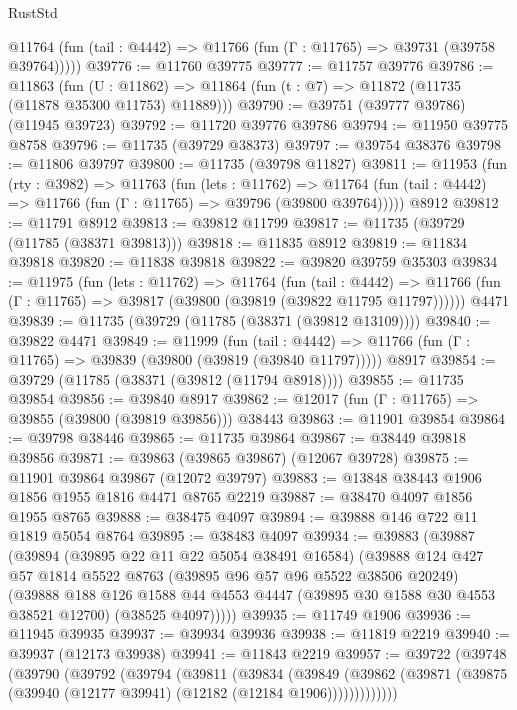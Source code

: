 \begin{lexlean}{RustStd}
\begin{coremodule}
      @11764 (fun (tail : @4442) => @11766 (fun (Γ : @11765) => @39731 (@39758 @39764)))))
@39776 := @11760 @39775
@39777 := @11757 @39776
@39786 := @11863
    (fun (U : @11862) => @11864 (fun (t : @7) => @11872 (@11735 (@11878 @35300 @11753) @11889)))
@39790 := @39751 (@39777 @39786) (@11945 @39723)
@39792 := @11720 @39776 @39786
@39794 := @11950 @39775 @8758
@39796 := @11735 (@39729 @38373)
@39797 := @39754 @38376
@39798 := @11806 @39797
@39800 := @11735 (@39798 @11827)
@39811 := @11953
    (fun (rty : @3982) =>
    @11763
      (fun (lets : @11762) =>
      @11764 (fun (tail : @4442) => @11766 (fun (Γ : @11765) => @39796 (@39800 @39764)))))
    @8912
@39812 := @11791 @8912
@39813 := @39812 @11799
@39817 := @11735 (@39729 (@11785 (@38371 @39813)))
@39818 := @11835 @8912
@39819 := @11834 @39818
@39820 := @11838 @39818
@39822 := @39820 @39759 @35303
@39834 := @11975
    (fun (lets : @11762) =>
    @11764
      (fun (tail : @4442) =>
      @11766 (fun (Γ : @11765) => @39817 (@39800 (@39819 (@39822 @11795 @11797))))))
    @4471
@39839 := @11735 (@39729 (@11785 (@38371 (@39812 @13109))))
@39840 := @39822 @4471
@39849 := @11999
    (fun (tail : @4442) => @11766 (fun (Γ : @11765) => @39839 (@39800 (@39819 (@39840 @11797)))))
    @8917
@39854 := @39729 (@11785 (@38371 (@39812 (@11794 @8918))))
@39855 := @11735 @39854
@39856 := @39840 @8917
@39862 := @12017 (fun (Γ : @11765) => @39855 (@39800 (@39819 @39856))) @38443
@39863 := @11901 @39854
@39864 := @39798 @38446
@39865 := @11735 @39864
@39867 := @38449 @39818 @39856
@39871 := @39863 (@39865 @39867) (@12067 @39728)
@39875 := @11901 @39864 @39867 (@12072 @39797)
@39883 := @13848 @38443 @1906 @1856 @1955 @1816 @4471 @8765 @2219
@39887 := @38470 @4097 @1856 @1955 @8765
@39888 := @38475 @4097
@39894 := @39888 @146 @722 @11 @1819 @5054 @8764
@39895 := @38483 @4097
@39934 := @39883
    (@39887
      (@39894
        (@39895 @22 @11 @22 @5054 @38491 @16584)
        (@39888
          @124
          @427
          @57
          @1814
          @5522
          @8763
          (@39895 @96 @57 @96 @5522 @38506 @20249)
          (@39888
            @188
            @126
            @1588
            @44
            @4553
            @4447
            (@39895 @30 @1588 @30 @4553 @38521 @12700)
            (@38525 @4097)))))
@39935 := @11749 @1906
@39936 := @11945 @39935
@39937 := @39934 @39936
@39938 := @11819 @2219
@39940 := @39937 (@12173 @39938)
@39941 := @11843 @2219
@39957 := @39722
    (@39748
      (@39790
        (@39792
          (@39794
            (@39811
              (@39834
                (@39849
                  (@39862 (@39871 (@39875 (@39940 (@12177 @39941) (@12182 (@12184 @1906)))))))))))))

\end{coremodule}
\end{lexlean}
